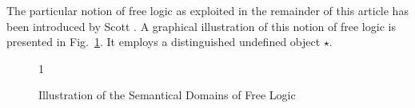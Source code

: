The particular notion of free logic as exploited in the remainder of
this article has been introduced by Scott \cite{scott67:_exist}.  A graphical
illustration of this notion of free logic is presented in
Fig.~\ref{fig1}. It
employs a distinguished undefined object $\star$.  
\begin{figure}
\centering
\newcommand\firstellipse{(2,-5) ellipse (6cm and 4cm)}
\newcommand\secondellipse{(0,-5.3) ellipse (3.5cm and 2.5cm)}1
\caption{Illustration of the Semantical Domains of Free Logic \label{fig1}}
\end{figure}



